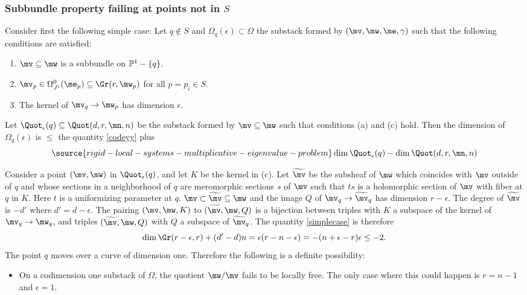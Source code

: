 \subsubsection{Subbundle property failing at points not in $S$}\label{bruck01}
Consider first the following simple case: Let $q\not\in S$ and $\Omega_q(\epsilon)\subset \Omega$ the substack formed by
$(\mv,\mw,\me,\gamma)$ such that the following conditions are satisfied:
\begin{enumerate}
\item[(a)] $\mv\subseteq \mw$ is a subbundle on $\Bbb{P}^1-\{q\}$.

\item[(b)]   $\mv_p\in \Omega^0_{J^i}(\me_p)\subseteq \Gr(r,\mw_p)$ for all $p=p_i\in S$.
\item[(c)] The kernel of $\mv_q\to\mw_p$ has  dimension $\epsilon$.
\end{enumerate}
Let $\Quot_{\epsilon}(q)\subseteq  \Quot(d,r,\mn,n) $ be the substack formed by $\mv\subseteq \mw$ such that conditions (a) and (c) hold. Then the dimension of  $\Omega_q(\epsilon)$ is $\leq$ the quantity \eqref{codeyy} plus
\begin{equation}\label{simplecase}
\source{rigid-local-systems-multiplicative-eigenvalue-problem}
\dim \Quot_{\epsilon}(q)-\dim  \Quot(d,r,\mn,n)
\end{equation}

Consider a point $(\mv,\mw)$ in  $\Quot_{\epsilon}(q)$, and let $K$ be the kernel in (c). Let $\widetilde{\mv}$ be the subsheaf of $\mw$ which coincides with $\mv$ outside of $q$ and whose sections in a neighborhood of $q$ are meromorphic sections $s$ of $\mv$ such that $ts$ is a holomorphic section of $\mv$ with fiber at $q$ in $K$. Here $t$ is a uniformizing parameter at $q$. $\mv\subset\widetilde{\mv}\subseteq\mw$ and the image  $Q$ of $\mv_q\to \widetilde{\mv}_q$ has dimension $r-\epsilon$. The degree of $\widetilde{\mv}$ is $-d'$ where $d'=d-\epsilon$. The pairing $(\mv,\mw,K)$ to $(\widetilde{\mv},\mw,Q)$ is a bijection between triples with $K$ a subspace of the kernel of $\mv_q\to \mw_q$, and triples $(\widetilde{\mv},\mw,Q)$ with $Q$ a subspace of $\widetilde{\mv}_q$. The quantity
\eqref{simplecase} is therefore
$$\dim \Gr(r-\epsilon,r)+ (d'-d)n=\epsilon (r-n-\epsilon) =-(n+\epsilon-r)\epsilon\leq -2.$$
The point $q$ moves over a curve of dimension one. Therefore the following is a definite possibility:
\begin{itemize}
\item On a codimension one substack of $\Omega$, the quotient $\mw/\mv$ fails to be locally free. The only case where  this could happen is
$r=n-1$ and $\epsilon=1$.
\end{itemize}
